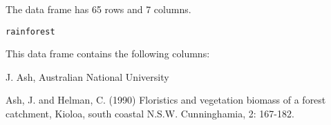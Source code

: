 \begin{Description}\relax
The  data frame has 65 rows and 7 columns.
\end{Description}
\begin{Usage}
\begin{verbatim}rainforest\end{verbatim}
\end{Usage}
\begin{Format}\relax
This data frame contains the following columns:
\end{Format}
\begin{Source}\relax
J. Ash, Australian National University
\end{Source}
\begin{References}\relax
Ash, J. and Helman, C. (1990) Floristics and vegetation
biomass of a forest catchment, Kioloa, south coastal N.S.W.
Cunninghamia, 2: 167-182.
\end{References}
\begin{Examples}
\end{Examples}

